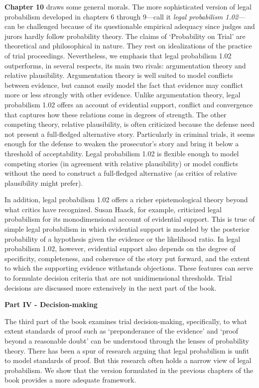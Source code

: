 \documentclass[
  10pt,
  dvipsnames,enabledeprecatedfontcommands]{scrartcl}
\begin{document}
\textbf{Chapter 10} draws some general morals. The more sophisticated
version of legal probabilism developed in chapters 6 through 9---call it
\textit{legal probabilism 1.02}---can be challenged because of its
questionable empirical adequacy since judges and jurors hardly follow
probability theory. The claims of `Probability on Trial' are theoretical
and philosophical in nature. They rest on idealizations of the practice
of trial proceedings. Nevertheless, we emphasis that legal probabilism
1.02 outperforms, in several respects, its main two rivals:
argumentation theory and relative plausibility. Argumentation theory is
well suited to model conflicts between evidence, but cannot easily model
the fact that evidence may conflict more or less strongly with other
evidence. Unlike argumentation theory, legal probabilism 1.02 offers an
account of evidential support, conflict and convergence that captures
how these relations come in degrees of strength. The other competing
theory, relative plausibility, is often criticized because the defense
need not present a full-fledged alternative story. Particularly in
criminal trials, it seems enough for the defense to weaken the
prosecutor's story and bring it below a threshold of acceptability.
Legal probabilism 1.02 is flexible enough to model competing stories (in
agreement with relative plausibility) or model conflicts without the
need to construct a full-fledged alternative (as critics of relative
plausibility might prefer).

In addition, legal probabilism 1.02 offers a richer epistemological
theory beyond what critics have recognized. Susan Haack, for example,
criticized legal probabilism for its monodimensional account of
evidential support. This is true of simple legal probabilism in which
evidential support is modeled by the posterior probability of a
hypothesis given the evidence or the likelihood ratio. In legal
probabilism 1.02, however, evidential support also depends on the degree
of specificity, completeness, and coherence of the story put forward,
and the extent to which the supporting evidence withstands objections.
These features can serve to formulate decision criteria that are not
unidimensional thresholds. Trial decisions are discussed more
extensively in the next part of the book.

\vspace{3mm}

\noindent \textbf{Part IV - Decision-making}

\noindent The third part of the book examines trial decision-making,
specifically, to what extent standards of proof such as `preponderance
of the evidence' and `proof beyond a reasonable doubt' can be understood
through the lenses of probability theory. There has been a spur of
research arguing that legal probabilism is unfit to model standards of
proof. But this research often holds a narrow view of legal probabilism.
We show that the version formulated in the previous chapters of the book
provides a more adequate framework.
\end{document}
